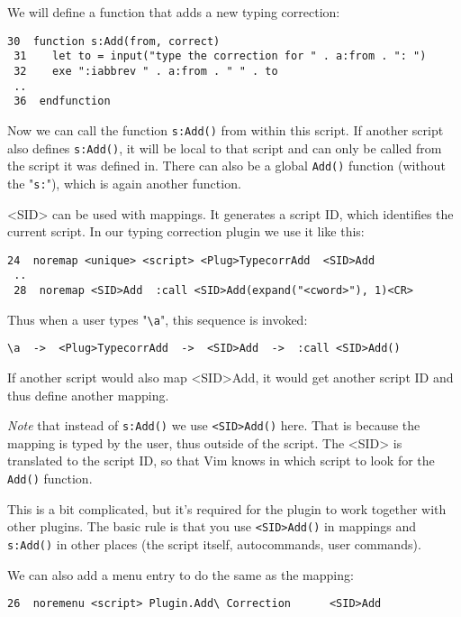 We will define a function that adds a new typing correction:

\begin{Verbatim}[samepage=true]
 30  function s:Add(from, correct)
 31    let to = input("type the correction for " . a:from . ": ")
 32    exe ":iabbrev " . a:from . " " . to
 ..
 36  endfunction
\end{Verbatim}

Now we can call the function \texttt{s:Add()} from within this script.
If another script also defines \texttt{s:Add()}, it will be local to that script and can only be called from the script it was defined in.
There can also be a global \texttt{Add()}  function (without the "\texttt{s:}"), which is again another function.

<SID> can be used with mappings.
It generates a script ID, which identifies the current script.
In our typing correction plugin we use it like this:

\begin{Verbatim}[samepage=true]
 24  noremap <unique> <script> <Plug>TypecorrAdd  <SID>Add
 ..
 28  noremap <SID>Add  :call <SID>Add(expand("<cword>"), 1)<CR>
\end{Verbatim}

Thus when a user types "\texttt{\textbackslash{}a}", this sequence is invoked:

\begin{Verbatim}[samepage=true]
 \a  ->  <Plug>TypecorrAdd  ->  <SID>Add  ->  :call <SID>Add()
\end{Verbatim}

If another script would also map <SID>Add, it would get another script ID and thus define another mapping.

\emph{Note} that instead of \texttt{s:Add()} we use \texttt{<SID>Add()} here.
That is because the mapping is typed by the user, thus outside of the script.
The <SID> is translated to the script ID, so that Vim knows in which script to look for the \texttt{Add()} function.

This is a bit complicated, but it's required for the plugin to work together with other plugins.
The basic rule is that you use \texttt{<SID>Add()} in mappings and \texttt{s:Add()} in other places (the script itself, autocommands, user commands).

We can also add a menu entry to do the same as the mapping:

\begin{Verbatim}[samepage=true]
 26  noremenu <script> Plugin.Add\ Correction      <SID>Add
\end{Verbatim}

